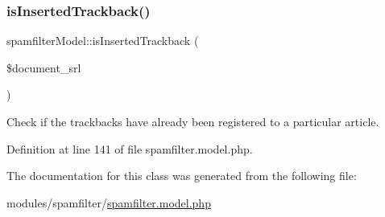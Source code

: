 \subsubsection{\texorpdfstring{is\+Inserted\+Trackback()}{isInsertedTrackback()}}
{\footnotesize\ttfamily spamfilter\+Model\+::is\+Inserted\+Trackback (\begin{DoxyParamCaption}\item[{}]{\$document\+\_\+srl }\end{DoxyParamCaption})}



Check if the trackbacks have already been registered to a particular article. 



Definition at line 141 of file spamfilter.\+model.\+php.



The documentation for this class was generated from the following file\+:\begin{DoxyCompactItemize}
\item 
modules/spamfilter/\hyperlink{spamfilter_8model_8php}{spamfilter.\+model.\+php}\end{DoxyCompactItemize}
